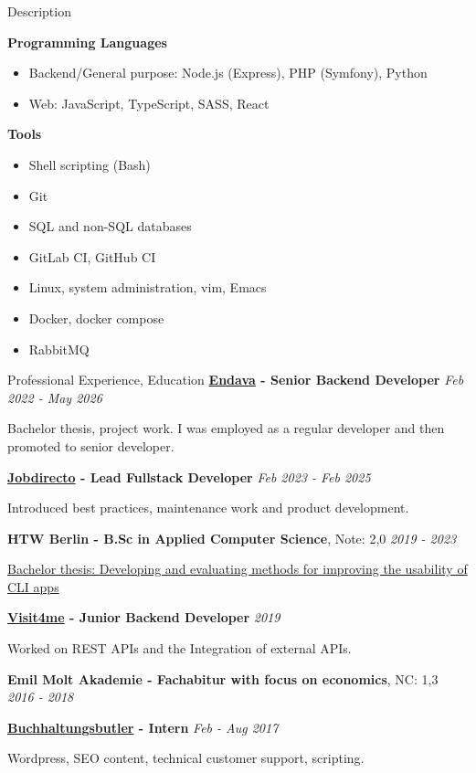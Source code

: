\documentclass{cv}
\begin{document}
\begin{rSection}{Description}
\begin{minipage}[t]{\skillWidth\linewidth}
    \textbf{Programming Languages}
    \begin{itemize}
      \item Backend/General purpose: Node.js (Express), PHP (Symfony), Python
      \item Web: JavaScript, TypeScript, SASS, React
    \end{itemize}

    \textbf{Tools}
    \begin{itemize}
      \item Shell scripting (Bash)
      \item Git
      \item SQL and non-SQL databases
      \item GitLab CI, GitHub CI
      \item Linux, system administration, vim, Emacs
      \item Docker, docker compose
      \item RabbitMQ
    \end{itemize}

  \end{minipage}
\end{rSection}

\begin{rSection}{Professional Experience, Education}
  \textbf{\href{https://www.endava.de/}{Endava} - Senior Backend Developer}
  \hfill {\em Feb 2022 - May 2026}

  Bachelor thesis, project work. I was employed as a regular developer and then promoted to senior developer.

  \textbf{\href{https://www.jobdirecto.com/}{Jobdirecto} - Lead Fullstack Developer}
  \hfill {\em Feb 2023 - Feb 2025}

  Introduced best practices, maintenance work and product development.

  \textbf{HTW Berlin - B.Sc in Applied Computer Science}, Note: 2,0 \hfill {\em 2019 - 2023}
  
  \href{https://github.com/jneidel/ba}{Bachelor thesis:
    Developing and evaluating methods for improving the usability of CLI apps}

  \textbf{\href{https://reach-out.app}{Visit4me} - Junior Backend Developer}
  \hfill {\em 2019}

  Worked on REST APIs and the Integration of external APIs.

  \textbf{Emil Molt Akademie - Fachabitur with focus on economics}, NC: 1,3 \hfill {\em 2016 - 2018}

  \smallskip
    \textbf{\href{https://buchhaltungsbutler.de/}{Buchhaltungsbutler} - Intern}
    \hfill {\em Feb - Aug 2017}

    Wordpress, SEO content, technical customer support, scripting.

\end{rSection}
\end{document}
